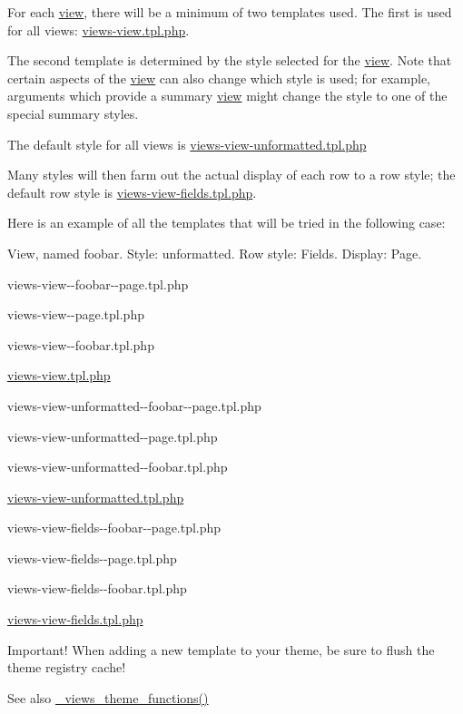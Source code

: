 For each \hyperlink{classview}{view}, there will be a minimum of two templates used. The first is used for all views: \hyperlink{views-view_8tpl_8php}{views-\/view.tpl.php}.

The second template is determined by the style selected for the \hyperlink{classview}{view}. Note that certain aspects of the \hyperlink{classview}{view} can also change which style is used; for example, arguments which provide a summary \hyperlink{classview}{view} might change the style to one of the special summary styles.

The default style for all views is \hyperlink{views-view-unformatted_8tpl_8php}{views-\/view-\/unformatted.tpl.php}

Many styles will then farm out the actual display of each row to a row style; the default row style is \hyperlink{views-view-fields_8tpl_8php}{views-\/view-\/fields.tpl.php}.

Here is an example of all the templates that will be tried in the following case:

View, named foobar. Style: unformatted. Row style: Fields. Display: Page.


\begin{DoxyItemize}
\item views-\/view-\/-\/foobar-\/-\/page.tpl.php
\item views-\/view-\/-\/page.tpl.php
\item views-\/view-\/-\/foobar.tpl.php
\item \hyperlink{views-view_8tpl_8php}{views-\/view.tpl.php}
\end{DoxyItemize}


\begin{DoxyItemize}
\item views-\/view-\/unformatted-\/-\/foobar-\/-\/page.tpl.php
\item views-\/view-\/unformatted-\/-\/page.tpl.php
\item views-\/view-\/unformatted-\/-\/foobar.tpl.php
\item \hyperlink{views-view-unformatted_8tpl_8php}{views-\/view-\/unformatted.tpl.php}
\end{DoxyItemize}


\begin{DoxyItemize}
\item views-\/view-\/fields-\/-\/foobar-\/-\/page.tpl.php
\item views-\/view-\/fields-\/-\/page.tpl.php
\item views-\/view-\/fields-\/-\/foobar.tpl.php
\item \hyperlink{views-view-fields_8tpl_8php}{views-\/view-\/fields.tpl.php}
\end{DoxyItemize}

Important! When adding a new template to your theme, be sure to flush the theme registry cache!

\begin{DoxySeeAlso}{See also}
\hyperlink{profiles_2dosomething_2modules_2contrib_2views_2theme_2theme_8inc_acf9e7bcb84ebc378f901f483143d0ff0}{\_\-views\_\-theme\_\-functions()} 
\end{DoxySeeAlso}
